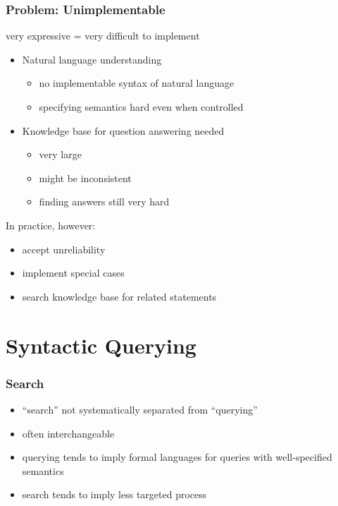 \begin{frame}\frametitle{Problem: Unimplementable}
very expressive = very difficult to implement
\begin{itemize}
\item Natural language understanding
 \begin{itemize}
 \item no implementable syntax of natural language
 \item specifying semantics hard even when controlled
 \end{itemize}
\item Knowledge base for question answering needed
 \begin{itemize}
 \item very large 
 \item might be inconsistent 
 \item finding answers still very hard
 \end{itemize}
\end{itemize}
 
In practice, however:
\begin{itemize}
 \item accept unreliability 
 \item implement special cases 
 \item search knowledge base for related statements 
\end{itemize}
\end{frame}


\section{Syntactic Querying}

\begin{frame}\frametitle{Search}
\begin{itemize}
\item ``search'' not systematically separated from ``querying''
\item often interchangeable
\item querying tends to imply formal languages for queries with well-specified semantics
\item search tends to imply less targeted process
\end{itemize}
\end{frame}


